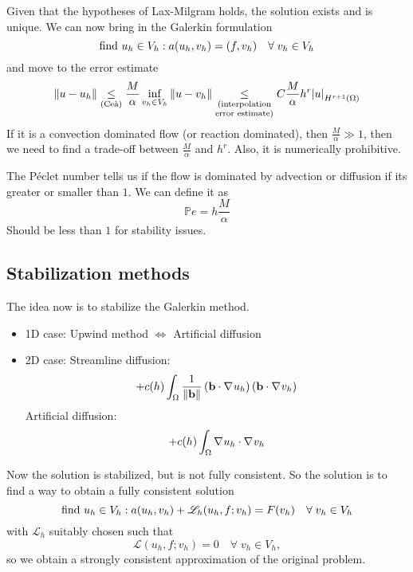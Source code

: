 Given that the hypotheses of Lax-Milgram holds, the solution exists and is unique. We can now bring in the Galerkin formulation
\[
    \text{find } u_h \in V_h : a(u_h, v_h) = (f,v_h) \quad \forall \; v_h \in V_h
\]
and move to the error estimate 
\[
    \norm{u-u_h} \underset{(\text{Ceà})}{\leq} \frac{M}{\alpha} \inf_{v_h \in V_h} \norm{u-v_h} \underset{\substack{(\text{interpolation} \\\text{error estimate})}}{\leq} C \frac{M}{\alpha} h^r \abs{u}_{H^{r+1}(\Omega)}
\]
If it is a convection dominated flow (or reaction dominated), then \(\frac{M}{\alpha} \gg 1\), then we need to find a trade-off between \(\frac{M}{\alpha}\) and \(h^r\). Also, it is numerically prohibitive. 

The Péclet number tells us if the flow is dominated by advection or diffusion if its greater or smaller than \(1\). We can define it as 
\[
    \mathbb{P}e = h\frac{M}{\alpha}
\]
Should be less than \(1\) for stability issues.
\subsection{Stabilization methods}
The idea now is to stabilize the Galerkin method. 
\begin{itemize}
    \item 1D case: Upwind method \(\iff\) Artificial diffusion
    \item 2D case: Streamline diffusion: 
    \[
        +c(h) \int_\Omega \frac{1}{\norm{\textbf{b}}} \left( \textbf{b} \cdot \nabla\mspace{1mu} u_h \right) \left( \textbf{b} \cdot \nabla\mspace{1mu} v_h \right)
    \]
    Artificial diffusion: 
    \[
        +c(h)\int_\Omega \nabla\mspace{1mu} u_h \cdot \nabla\mspace{1mu} v_h 
    \]
\end{itemize}
Now the solution is stabilized, but is not fully consistent. So the solution is to find a way to obtain a fully consistent solution 
\[
    \text{find } u_h \in V_h : a(u_h, v_h) + \mathscr{L}_h (u_h, f; v_h) = F(v_h) \quad \forall \; v_h \in V_h
\]
with \(\mathscr{L}_h\) suitably chosen such that
\[
    \mathscr{L}(u_h, f; v_h) = 0 \quad \forall \; v_h \in V_h,
\]
so we obtain a strongly consistent approximation of the original problem.

